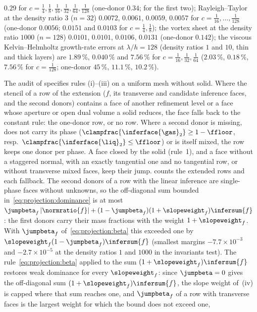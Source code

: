 $0.29$ for $c=\frac14,\frac18,\frac1{16},\frac1{32},\frac1{64},\frac1{128}$
(one-donor $0.34$;  for the first two); Rayleigh--Taylor at the
density ratio $3$ ($n=32$) $0.0072$, $0.0061$, $0.0059$, $0.0057$ for
$c=\frac1{16},\dots,\frac1{128}$ (one-donor $0.0056$; $0.0151$ and $0.0103$
for $c=\frac14,\frac18$); the vortex sheet at the density ratio $1000$
($n=128$) $0.0101$, $0.0101$, $0.0106$, $0.0131$ (one-donor $0.142$); the
viscous Kelvin--Helmholtz growth-rate errors at $\lambda/h=128$ (density
ratios $1$ and $10$, thin and thick layers) are $1.89\,\%$, $0.040\,\%$ and
$7.56\,\%$ for $c=\frac1{16},\frac1{32},\frac1{64}$ ($2.03\,\%$, $0.18\,\%$,
$7.56\,\%$ for $c=\frac1{128}$; one-donor $45\,\%$, $11.1\,\%$, $10.2\,\%$).

The audit of  specifies rules (i)--(iii) on a uniform mesh without
solid. Where the stencil of a row of the extension ($f$, its transverse and
candidate inference faces, and the second donors) contains a face of another
refinement level or a face whose aperture or open dual volume a solid
reduces, the face falls back to the constant rule: the one-donor row, or no
row. Where a second donor is missing, does not carry its phase
($\clampfrac{\inferface{\gas}_2}\ge1-\ffloor$, resp.\
$\clampfrac{\inferface{\liq}_2}\le\ffloor$) or is itself mixed, the row
keeps one donor per phase. A face closed by the solid (rule~1), and a face
without a staggered normal, with an exactly tangential one and no tangential
row, or without transverse mixed faces, keep their jump.
 counts the extended rows and each
fallback. The second donors of a row with the linear inference are
single-phase faces without unknowns, so the off-diagonal sum bounded
in~\cref{eq:projection:dominance} is at most
$\jumpbeta_f\abs{\normratio{f}}+(1-\jumpbeta_f)(1+\slopeweight_f)\infersum{f}$:
the first donors carry their mass fractions with the weight
$1+\slopeweight_f$. With $\jumpbeta_f$ of~\cref{eq:projection:beta} this
exceeded one by $\slopeweight_f(1-\jumpbeta_f)\infersum{f}$ (smallest margins
$-7.7\times10^{-3}$ and $-2.7\times10^{-5}$ at the density ratios $1$ and
$1000$ in the invariants test). The rule~\cref{eq:projection:beta} applied to
the sum $(1+\slopeweight_f)\infersum{f}$ restores weak dominance for every
$\slopeweight_f$: since $\jumpbeta=0$ gives the off-diagonal sum
$(1+\slopeweight_f)\infersum{f}$, the slope weight of~(iv) is capped where
that sum reaches one, and $\jumpbeta_f$ of a row with transverse faces is the
largest weight for which the bound does not exceed one,
